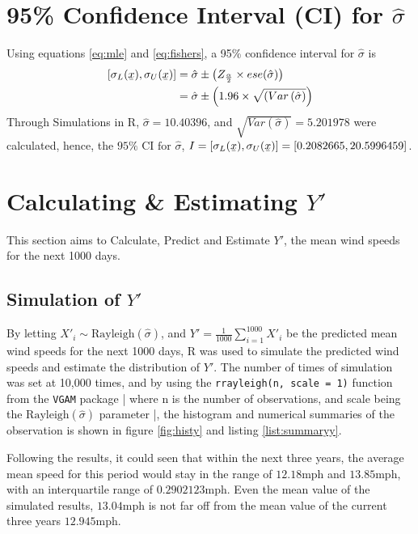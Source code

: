 \documentclass[11pt]{article}
\newcommand\barbelow[1]{\stackunder[1.2pt]{$#1$}{\rule{.8ex}{.075ex}}}
\begin{document}
\section{95\% Confidence Interval (CI) for $\hat{\sigma}$}
Using equations \ref{eq:mle} and \ref{eq:fishers}, a 95\% confidence interval for $\hat{\sigma}$ is
\begin{equation}
    \begin{split}
        \left[\sigma_{L}(\barbelow{x}),\sigma_{U}(\barbelow{x})\right] &= \hat{\sigma} \pm \left(Z_{\frac{\alpha}{2}}\times ese(\hat{\sigma})\right)\\
        &= \hat{\sigma}\pm\left(1.96\times \sqrt{(Var\left(\hat{\sigma}\right)}\right)
    \end{split}
\end{equation}
Through Simulations in R, $\hat{\sigma}=10.40396$, and $\sqrt{Var\left(\hat{\sigma}\right)}=5.201978$ were calculated, hence, the $95\% \text{ CI for }\hat{\sigma}$, $I=\left[\sigma_{L}(\barbelow{x}),\sigma_{U}(\barbelow{x})\right]=[0.2082665, 20.5996459]$.

\section{Calculating \& Estimating $Y'$}
This section aims to Calculate, Predict and Estimate $Y'$, the mean wind speeds for the next 1000 days.
\subsection{Simulation of $Y'$}
\par By letting $X'_{i}\sim\text{Rayleigh}(\hat{\sigma})$, and $Y' = \frac{1}{1000}\sum_{i=1}^{1000}X'_{i}$ be the predicted mean wind speeds for the next 1000 days, R was used to simulate the predicted wind speeds and estimate the distribution of $Y'$. The number of times of simulation was set at 10,000 times, and by using the \verb|rrayleigh(n, scale = 1)| function from the \verb|VGAM| package | where n is the number of observations, and scale being the $\text{Rayleigh}(\hat{\sigma})$ parameter |, the histogram and numerical summaries of the observation is shown in figure \ref{fig:histy} and listing \ref{list:summaryy}.\\
\par Following the results, it could seen that within the next three years, the average mean speed for this period would stay in the range of $12.18$mph and $13.85$mph, with an interquartile range of $0.2902123$mph. Even the mean value of the simulated results, $13.04$mph is not far off from the mean value of the current three years $12.945$mph.
\end{document}
